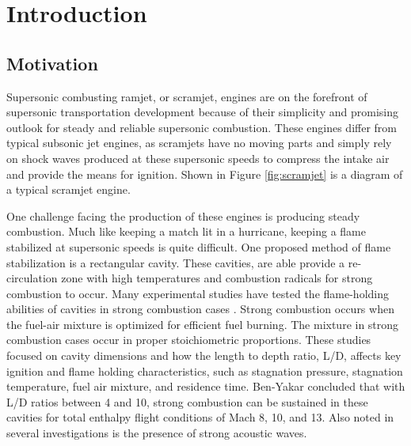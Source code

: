 
\chapter{Introduction} %

\label{Chapter2} %


\section{Motivation}

Supersonic combusting ramjet, or scramjet, engines are on the forefront of supersonic transportation development because of their simplicity and promising outlook for steady and reliable supersonic combustion. These engines differ from typical subsonic jet engines, as scramjets have no moving parts and simply rely on shock waves produced at these supersonic speeds to compress the intake air and provide the means for ignition. Shown in Figure \ref{fig:scramjet} is a diagram of a typical scramjet engine.

One challenge facing the production of these engines is producing steady combustion. Much like keeping a match lit in a hurricane, keeping a flame stabilized at supersonic speeds is quite difficult. One proposed method of flame stabilization is a rectangular cavity. These cavities, are able provide a re-circulation zone with high temperatures and combustion radicals for strong combustion to occur. Many experimental studies have tested the flame-holding abilities of cavities in strong combustion cases \cite{ben2000experimental,ben2001cavity,do2009plasma,yilmaz2013investigation}. Strong combustion occurs when the fuel-air mixture is optimized for efficient fuel burning. The mixture in strong combustion cases occur in proper stoichiometric proportions. These studies focused on cavity dimensions and how the length to depth ratio, L/D, affects key ignition and flame holding characteristics, such as stagnation pressure, stagnation temperature, fuel air mixture, and residence time. Ben-Yakar concluded that with L/D ratios between 4 and 10, strong combustion can be sustained in these cavities for total enthalpy flight conditions of Mach 8, 10, and 13\cite{ben2001cavity}. Also noted in several investigations is the presence of strong acoustic waves\cite{unalmis2004cavity,heller1996letter,williams2007supersonic, mcgregor1970drag,luo2011drag, sato1999advanced}. 

